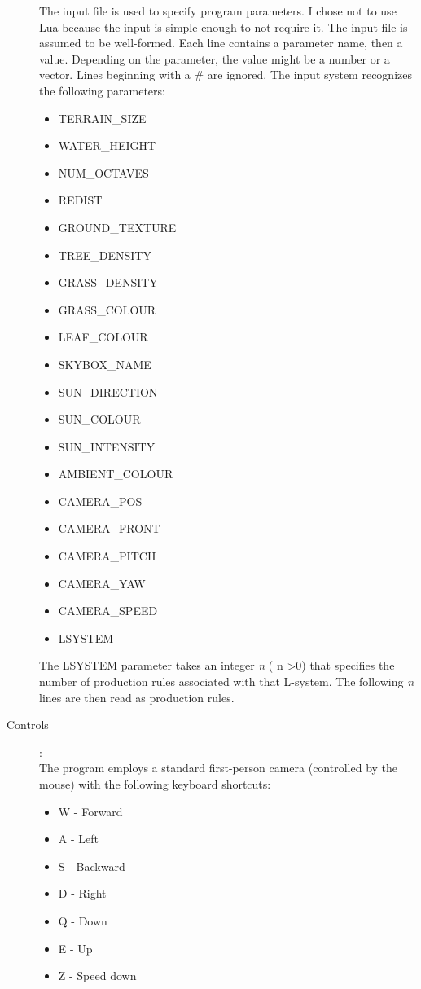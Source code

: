 \documentclass{article}
\begin{document}
\begin{description}
		The input file is used to specify program parameters. I chose not to use Lua because the input is simple enough to not require it.
		The input file is assumed to be well-formed. Each line contains a parameter name, then a value. Depending on the parameter, the value might be a number or a vector. Lines beginning with a \# are ignored.
		The input system recognizes the following parameters:
		\begin{itemize}
			\item TERRAIN\_SIZE
			\item WATER\_HEIGHT
			\item NUM\_OCTAVES
			\item REDIST
			\item GROUND\_TEXTURE
			\item TREE\_DENSITY
			\item GRASS\_DENSITY
			\item GRASS\_COLOUR
			\item LEAF\_COLOUR
			\item SKYBOX\_NAME
			\item SUN\_DIRECTION
			\item SUN\_COLOUR
			\item SUN\_INTENSITY
			\item AMBIENT\_COLOUR
			\item CAMERA\_POS
			\item CAMERA\_FRONT
			\item CAMERA\_PITCH
			\item CAMERA\_YAW
			\item CAMERA\_SPEED
			\item LSYSTEM
		\end{itemize}
		The LSYSTEM parameter takes an integer \textit{n} ( n \textgreater 0) that specifies the number of production rules associated with that L-system. The following \textit{n} lines are then read as production rules.
	\item[Controls]:\\
		The program employs a standard first-person camera (controlled by the mouse) with the following keyboard shortcuts:
		\begin{itemize}
			\item W - Forward
			\item A - Left
			\item S - Backward
			\item D - Right
			\item Q - Down
			\item E - Up
			\item Z - Speed down

\end{itemize}
\end{description}
\end{document}
